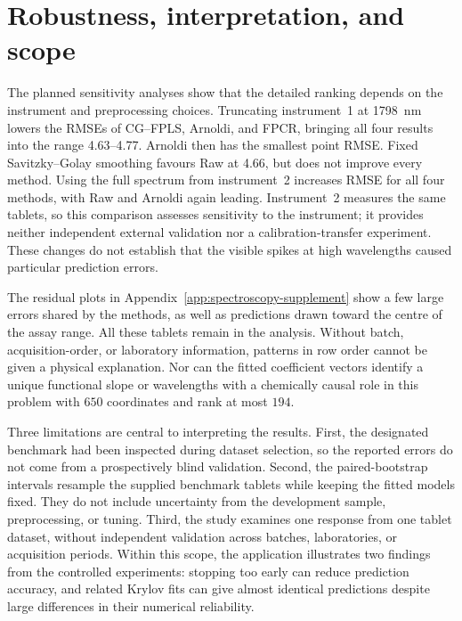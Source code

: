 \section{Robustness, interpretation, and scope}
\label{sec:spectroscopy-scope}

The planned sensitivity analyses show that the detailed ranking depends on
the instrument and preprocessing choices.  Truncating instrument~1 at
1798~nm lowers the RMSEs of CG--FPLS, Arnoldi, and FPCR, bringing all four
results into the range 4.63--4.77.  Arnoldi then has the smallest point RMSE.
Fixed Savitzky--Golay smoothing favours Raw at 4.66, but does not improve every
method.  Using the full spectrum from instrument~2 increases RMSE for all
four methods, with Raw and Arnoldi again leading.  Instrument~2 measures the
same tablets, so this comparison assesses sensitivity to the instrument;
it provides neither independent external validation nor a calibration-transfer
experiment.  These changes do not establish that the visible spikes at high
wavelengths caused particular prediction errors.

\begin{samepage}
The residual plots in Appendix~\ref{app:spectroscopy-supplement} show a few
large errors shared by the methods, as well as predictions drawn toward the
centre of the assay range.  All these tablets remain in the analysis.
Without batch, acquisition-order, or laboratory information, patterns in row
order cannot be given a physical explanation.  Nor can the fitted coefficient
vectors identify a unique functional slope or wavelengths with a chemically
causal role in this problem with $650$ coordinates and rank at most $194$.
\par
\end{samepage}

Three limitations are central to interpreting the results.  First, the
designated benchmark had been inspected during dataset selection, so the
reported errors do not come from a prospectively blind validation.  Second,
the paired-bootstrap intervals resample the supplied benchmark tablets while
keeping the fitted models fixed.  They do not include uncertainty from the
development sample, preprocessing, or tuning.  Third, the study examines one
response from one tablet dataset, without independent validation across
batches, laboratories, or acquisition periods.  Within this scope, the
application illustrates two findings from the controlled experiments:
stopping too early can reduce prediction accuracy, and related Krylov fits
can give almost identical predictions despite large differences in their
numerical reliability.
